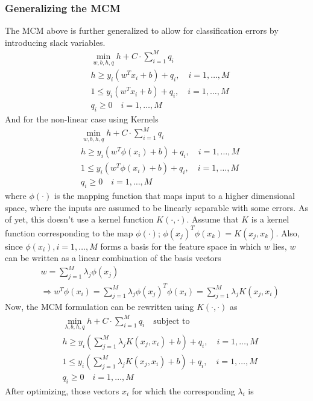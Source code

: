 \documentclass[11pt]{article}
\begin{document}
\subsubsection{Generalizing the MCM}
The MCM above is further generalized to allow for classification errors by
introducing slack variables.
\begin{align*}
    &\min_{w,b,h,q}h+C\cdot\sum_{i=1}^Mq_i\\
    &h\ge y_i(w^Tx_i+b)+q_i,\quad i=1,\dotsc,M\\
    &1\le y_i(w^Tx_i+b)+q_i,\quad i=1,\dotsc,M\\
    &q_i\ge 0\quad i=1,\dotsc,M
\end{align*}
And for the non-linear case using Kernels
\begin{align}
    &\min_{w,b,h,q}h+C\cdot\sum_{i=1}^Mq_i\\
    &h\ge y_i(w^T\phi(x_i)+b)+q_i,\quad i=1,\dotsc,M\\
    &1\le y_i(w^T\phi(x_i)+b)+q_i,\quad i=1,\dotsc,M\\
    &q_i\ge 0\quad i=1,\dotsc,M
\end{align}
where $\phi(\cdot)$ is the mapping function that maps input to a higher
dimensional space, where the inputs are assumed to be linearly separable with
some errors. As of yet, this doesn't use a kernel function $K(\cdot,\cdot)$. Assume that $K$
is a kernel function corresponding to the map $\phi(\cdot)$;
$\phi(x_j)^T\phi(x_k)=K(x_j,x_k)$. Also, since $\phi(x_i), i=1,\dotsc,M$ forms a
basis for the feature space in which $w$ lies, $w$ can be written as a linear
combination of the basis vectors
\begin{align*}
    &w=\sum_{j=1}^M\lambda_j\phi(x_j)\\
    &\Rightarrow
    w^T\phi(x_i)=\sum_{j=1}^M\lambda_j\phi(x_j)^T\phi(x_i)=\sum_{j=1}^M\lambda_jK(x_j,x_i)
\end{align*}
Now, the MCM formulation can be rewritten using $K(\cdot,\cdot)$ as
\begin{align}
    &\label{eq:mcmstart}\min_{\lambda,b,h,q}h+C\cdot\sum_{i=1}^Mq_i\quad\text{subject to}\\
    &\label{eq:upbound}h\ge y_i\left(\sum_{j=1}^M\lambda_jK(x_j,x_i)+b\right)+q_i,\quad i=1,\dotsc,M\\
    &1\le y_i\left(\sum_{j=1}^M\lambda_jK(x_j,x_i)+b\right)+q_i,\quad i=1,\dotsc,M\\
    &\label{eq:mcmend}q_i\ge 0\quad i=1,\dotsc,M
\end{align}
After optimizing, those vectors $x_i$ for which the corresponding $\lambda_i$ is
\end{document}
